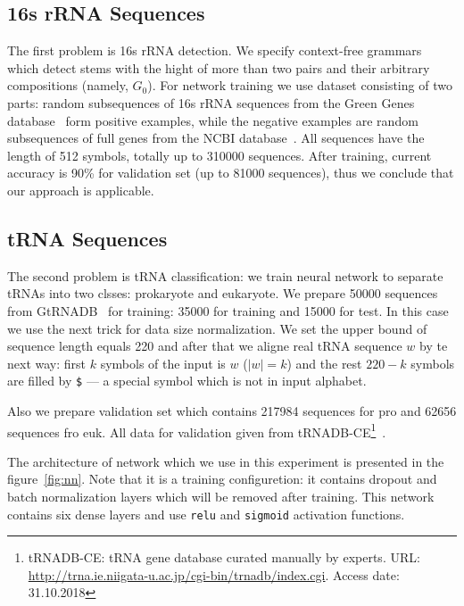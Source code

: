 \documentclass[a4paper,twoside]{article}
\begin{document}
\subsection{16s rRNA Sequences}
\noindent The first problem is 16s rRNA detection.
We specify context-free grammars which detect stems with the hight of more than two pairs and their arbitrary compositions (namely, $G_0$).
For network training we use dataset consisting of two parts: random subsequences of 16s rRNA sequences from the Green Genes database~\cite{pmid16820507} form positive examples, while the negative examples are random subsequences of full genes from the NCBI database~\cite{pmid19854944}.
All sequences have the length of 512 symbols, totally up to 310000 sequences.
After training, current accuracy is 90\% for validation set (up to 81000 sequences), thus we conclude that our approach is applicable.

\subsection{tRNA Sequences}

\noindent The second problem is tRNA classification: we train neural network to separate tRNAs into two clsses: prokaryote and eukaryote.
We prepare 50000 sequences from GtRNADB~\cite{Chan2009} for training: 35000 for training and 15000 for test.
In this case we use the next trick for data size normalization.
We set the upper bound of sequence length equals 220 and after that we aligne real tRNA sequence $w$ by te next way: first $k$ symbols of the input is $w$ ($|w|=k$) and the rest $220-k$ symbols are filled by \verb|$| --- a special symbol which is not in input alphabet.

Also we prepare validation set which contains 217984 sequences for pro and 62656 sequences fro euk.
All data for validation given from tRNADB-CE\footnote{tRNADB-CE: tRNA gene database curated manually by experts. URL: \url{http://trna.ie.niigata-u.ac.jp/cgi-bin/trnadb/index.cgi}. Access date: 31.10.2018}~\cite{Abe2010}.

The architecture of network which we use in this experiment is presented in the figure~\ref{fig:nn}.
Note that it is a training configuretion: it contains dropout and batch normalization layers which will be removed after training.
This network contains six dense layers and use \verb|relu| and \verb|sigmoid| activation functions.
\end{document}
